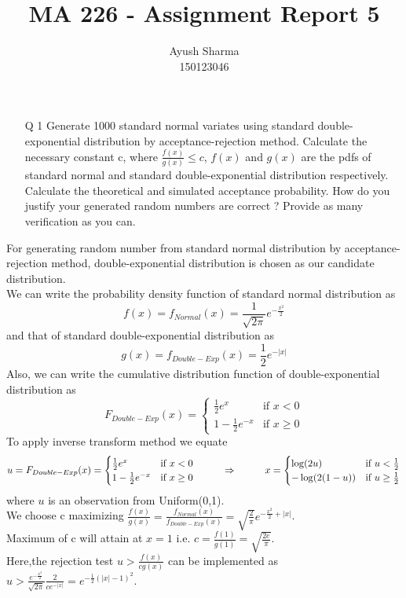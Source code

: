 \documentclass[11pt]{article}
\title{MA 226 - Assignment Report 5}
\author{Ayush Sharma\\150123046}
\begin{document}
\titlepage
\newpage

\begin{enumerate}
\item[Q 1]   Generate 1000 standard normal variates using standard double-exponential distribution by acceptance-rejection method.
Calculate the necessary constant c, where $\frac{f(x)}{g(x)} \leq c$, $f(x)$ and $g(x)$ are the pdfs of standard normal and standard double-exponential distribution respectively.
Calculate the theoretical and simulated acceptance probability.
How do you justify your generated random numbers are correct ?
Provide as many verification as you can.
\end{enumerate}

  For generating random number from standard normal distribution by acceptance-rejection method, double-exponential distribution is chosen as our candidate distribution.\\
We can write the probability density function of standard normal distribution as
$$f(x) = f_{Normal}(x) = \frac{1}{\sqrt{2\pi}}e^{-\frac{x^2}{2}}$$
and that of standard double-exponential distribution as
$$g(x) = f_{Double-Exp}(x) = \frac{1}{2}e^{-|x|}$$
Also, we can write the cumulative distribution function of double-exponential distribution as
$$F_{Double-Exp}(x) = \begin{cases} \frac{1}{2}e^x & \text{if $x < 0$} \\ 1 - \frac{1}{2}e^{-x} & \text{if $x \geq 0$} \end{cases}$$
To apply inverse transform method we equate
$$u = F_{Double-Exp}(x) = \begin{cases} \frac{1}{2}e^x & \text{if $x < 0$} \\ 1 - \frac{1}{2}e^{-x} & \text{if $x \geq 0$} \end{cases} \hspace{10mm} \Rightarrow \hspace{10mm} x = \begin{cases} \log(2u) & \text{if $u < \frac{1}{2}$} \\ -\log(2(1 - u)) & \text{if $u \geq \frac{1}{2}$} \end{cases}$$
where $u$ is an observation from Uniform(0,1).\\
We choose c maximizing $\frac{f(x)}{g(x)} = \frac{f_{Normal}(x)}{f_{Double-Exp}(x)} = \sqrt{\frac{2}{\pi}}e^{-\frac{x^2}{2} + |x|}$.\\
Maximum of c will attain at $x = 1$ i.e. $c = \frac{f(1)}{g(1)} = \sqrt{\frac{2e}{\pi}}$.\\
Here,the rejection test $u > \frac{f(x)}{cg(x)}$ can be implemented as $u > \frac{e^{-\frac{x^2}{2}}}{\sqrt{2\pi}}\frac{2}{ce^{-|x|}} = e^{-\frac{1}{2}(|x| - 1)^{2}}$.
\end{document}
